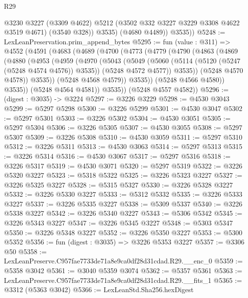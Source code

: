 \begin{lexlean}{R29}
\begin{coremodule}
              @3230
              @3227
              (@3309 @4622)
              @5212
              (@3502 @332 @3227 @3229 @3308 @4622 @3519 @4671)
              (@3540 @328))
            @3535)
          (@4680 @4489))
        @3535))
@5248 := LexLeanPreservation.prim_append_bytes
@5295 := fun (value : @311) =>
  @4552
    (@4591
      (@4683
        (@4689
          (@4700
            (@4773
              (@4779
                (@4790
                  (@4863
                    (@4869
                      (@4880
                        (@4953
                          (@4959
                            (@4970
                              (@5043
                                (@5049
                                  (@5060
                                    (@5114 (@5120 (@5247 (@5248 @4574 @4576)) @3535))
                                    (@5248 @4572 @4577))
                                  @3535))
                              (@5248 @4570 @4578))
                            @3535))
                        (@5248 @4568 @4579))
                      @3535))
                  (@5248 @4566 @4580))
                @3535))
            (@5248 @4564 @4581))
          @3535))
      (@5248 @4557 @4582))
@5296 := (digest : @3035) -> @3224
@5297 := @3226 @3229
@5298 := @4530 @3043
@5299 := @5297 @5298
@5300 := @3226 @5299
@5301 := @4530 @3047
@5302 := @5297 @5301
@5303 := @3226 @5302
@5304 := @4530 @3051
@5305 := @5297 @5304
@5306 := @3226 @5305
@5307 := @4530 @3055
@5308 := @5297 @5307
@5309 := @3226 @5308
@5310 := @4530 @3059
@5311 := @5297 @5310
@5312 := @3226 @5311
@5313 := @4530 @3063
@5314 := @5297 @5313
@5315 := @3226 @5314
@5316 := @4530 @3067
@5317 := @5297 @5316
@5318 := @3226 @5317
@5319 := @4530 @3071
@5320 := @5297 @5319
@5322 := @3226 @5320 @3227
@5323 := @5318 @5322
@5325 := @3226 @5323 @3227
@5327 := @3226 @5325 @3227
@5328 := @5315 @5327
@5330 := @3226 @5328 @3227
@5332 := @3226 @5330 @3227
@5333 := @5312 @5332
@5335 := @3226 @5333 @3227
@5337 := @3226 @5335 @3227
@5338 := @5309 @5337
@5340 := @3226 @5338 @3227
@5342 := @3226 @5340 @3227
@5343 := @5306 @5342
@5345 := @3226 @5343 @3227
@5347 := @3226 @5345 @3227
@5348 := @5303 @5347
@5350 := @3226 @5348 @3227
@5352 := @3226 @5350 @3227
@5353 := @5300 @5352
@5356 := fun (digest : @3035) => @3226 @5353 @3227
@5357 := @3306 @50
@5358 := LexLeanPreserve.C957fae7733de71a8e9ca0df28d31cdad.R29.__enc_0
@5359 := @5358 @3042
@5361 := @3040 @5359 @3074
@5362 := @5357 @5361
@5363 := LexLeanPreserve.C957fae7733de71a8e9ca0df28d31cdad.R29.__fits_1
@5365 := @3312 (@5363 @3042)
@5366 := LexLeanStd.Sha256.hexDigest

\end{coremodule}
\end{lexlean}
